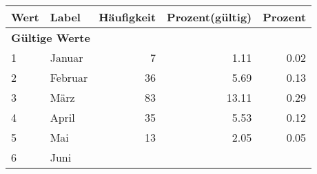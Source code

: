      \begin{longtable}{lXrrr}
     \toprule
     \textbf{Wert} & \textbf{Label} & \textbf{Häufigkeit} & \textbf{Prozent(gültig)} & \textbf{Prozent} \\
     \endhead
     \midrule
     \multicolumn{5}{l}{\textbf{Gültige Werte}}\\

     1 &
     \multicolumn{1}{X}{ Januar   } &


       \num{7} &
       \num[round-mode=places,round-precision=2]{1,11} &
         \num[round-mode=places,round-precision=2]{0,02} \\

     2 &
     \multicolumn{1}{X}{ Februar   } &


       \num{36} &
       \num[round-mode=places,round-precision=2]{5,69} &
         \num[round-mode=places,round-precision=2]{0,13} \\

     3 &
     \multicolumn{1}{X}{ März   } &


       \num{83} &
       \num[round-mode=places,round-precision=2]{13,11} &
         \num[round-mode=places,round-precision=2]{0,29} \\

     4 &
     \multicolumn{1}{X}{ April   } &


       \num{35} &
       \num[round-mode=places,round-precision=2]{5,53} &
         \num[round-mode=places,round-precision=2]{0,12} \\

     5 &
     \multicolumn{1}{X}{ Mai   } &


       \num{13} &
       \num[round-mode=places,round-precision=2]{2,05} &
         \num[round-mode=places,round-precision=2]{0,05} \\

     6 &
     \multicolumn{1}{X}{ Juni   } &



\end{longtable}
